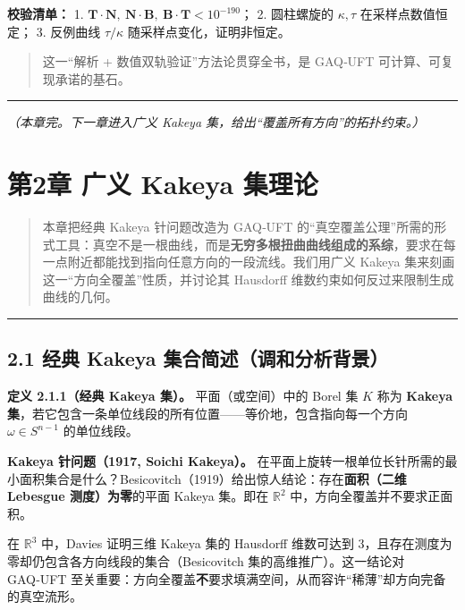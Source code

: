 \textbf{校验清单：} 1.
\(\mathbf{T}\cdot\mathbf{N},\ \mathbf{N}\cdot\mathbf{B},\ \mathbf{B}\cdot\mathbf{T}<10^{-190}\)；
2. 圆柱螺旋的 \(\kappa,\tau\) 在采样点数值恒定； 3. 反例曲线
\(\tau/\kappa\) 随采样点变化，证明非恒定。

\begin{quote}
这一``解析 + 数值双轨验证''方法论贯穿全书，是 GAQ‑UFT
可计算、可复现承诺的基石。
\end{quote}

\begin{center}\rule{0.5\linewidth}{0.5pt}\end{center}

\emph{（本章完。下一章进入广义 Kakeya
集，给出``覆盖所有方向''的拓扑约束。）}

\section{第2章 广义 Kakeya
集理论}\label{ux7b2c2ux7ae0-ux5e7fux4e49-kakeya-ux96c6ux7406ux8bba-1}

\begin{quote}
本章把经典 Kakeya 针问题改造为 GAQ‑UFT
的``真空覆盖公理''所需的形式工具：真空不是一根曲线，而是\textbf{无穷多根扭曲曲线组成的系综}，要求在每一点附近都能找到指向任意方向的一段流线。我们用广义
Kakeya 集来刻画这一``方向全覆盖''性质，并讨论其 Hausdorff
维数约束如何反过来限制生成曲线的几何。
\end{quote}

\begin{center}\rule{0.5\linewidth}{0.5pt}\end{center}

\subsection{2.1 经典 Kakeya
集合简述（调和分析背景）}\label{ux7ecfux5178-kakeya-ux96c6ux5408ux7b80ux8ff0ux8c03ux548cux5206ux6790ux80ccux666f}

\textbf{定义 2.1.1（经典 Kakeya 集）。} 平面（或空间）中的 Borel 集
\(K\) 称为 \textbf{Kakeya
集}，若它包含一条单位线段的所有位置------等价地，包含指向每一个方向
\(\omega\in S^{n-1}\) 的单位线段。

\textbf{Kakeya 针问题（1917, Soichi Kakeya）。}
在平面上旋转一根单位长针所需的最小面积集合是什么？Besicovitch（1919）给出惊人结论：存在\textbf{面积（二维
Lebesgue 测度）为零}的平面 Kakeya 集。即在 \(\mathbb{R}^2\)
中，方向全覆盖并不要求正面积。

在 \(\mathbb{R}^3\) 中，Davies 证明三维 Kakeya 集的 Hausdorff 维数可达到
\(3\)，且存在测度为零却仍包含各方向线段的集合（Besicovitch
集的高维推广）。这一结论对 GAQ‑UFT
至关重要：方向全覆盖\textbf{不}要求填满空间，从而容许``稀薄''却方向完备的真空流形。

